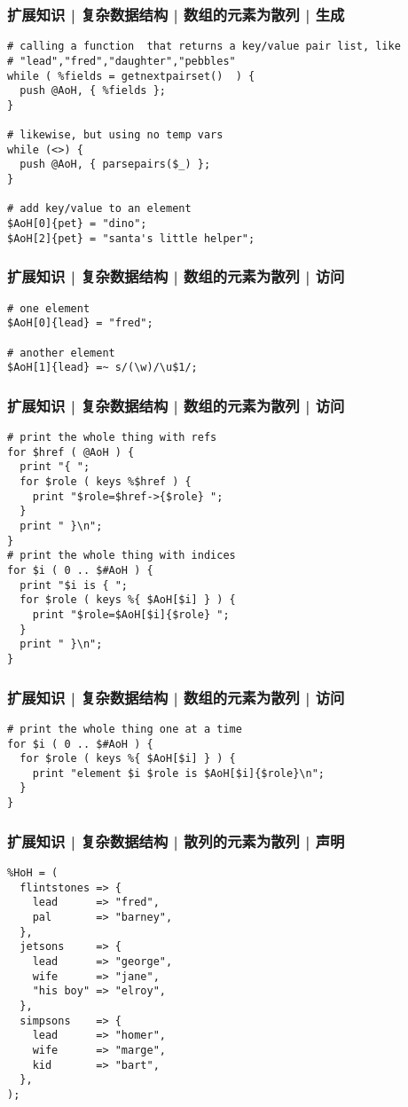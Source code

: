 \begin{frame}[fragile]
  \frametitle{扩展知识 | 复杂数据结构 | 数组的元素为散列 | 生成}
\begin{lstlisting}
# calling a function  that returns a key/value pair list, like
# "lead","fred","daughter","pebbles"
while ( %fields = getnextpairset()  ) {
  push @AoH, { %fields };
}

# likewise, but using no temp vars
while (<>) {
  push @AoH, { parsepairs($_) };
}

# add key/value to an element
$AoH[0]{pet} = "dino";
$AoH[2]{pet} = "santa's little helper";
\end{lstlisting}
\end{frame}

\begin{frame}[fragile]
  \frametitle{扩展知识 | 复杂数据结构 | 数组的元素为散列 | 访问}
\begin{lstlisting}
# one element
$AoH[0]{lead} = "fred";

# another element
$AoH[1]{lead} =~ s/(\w)/\u$1/;
\end{lstlisting}
\end{frame}

\begin{frame}[fragile]
  \frametitle{扩展知识 | 复杂数据结构 | 数组的元素为散列 | 访问}
\begin{lstlisting}
# print the whole thing with refs
for $href ( @AoH ) {
  print "{ ";
  for $role ( keys %$href ) {
    print "$role=$href->{$role} ";
  }
  print " }\n";
}
# print the whole thing with indices
for $i ( 0 .. $#AoH ) {
  print "$i is { ";
  for $role ( keys %{ $AoH[$i] } ) {
    print "$role=$AoH[$i]{$role} ";
  }
  print " }\n";
}
\end{lstlisting}
\end{frame}

\begin{frame}[fragile]
  \frametitle{扩展知识 | 复杂数据结构 | 数组的元素为散列 | 访问}
\begin{lstlisting}
# print the whole thing one at a time
for $i ( 0 .. $#AoH ) {
  for $role ( keys %{ $AoH[$i] } ) {
    print "element $i $role is $AoH[$i]{$role}\n";
  }
}
\end{lstlisting}
\end{frame}

\begin{frame}[fragile]
  \frametitle{扩展知识 | 复杂数据结构 | 散列的元素为散列 | 声明}
\begin{lstlisting}
%HoH = (
  flintstones => {
    lead      => "fred",
    pal       => "barney",
  },
  jetsons     => {
    lead      => "george",
    wife      => "jane",
    "his boy" => "elroy",
  },
  simpsons    => {
    lead      => "homer",
    wife      => "marge",
    kid       => "bart",
  },
);
\end{lstlisting}
\end{frame}

